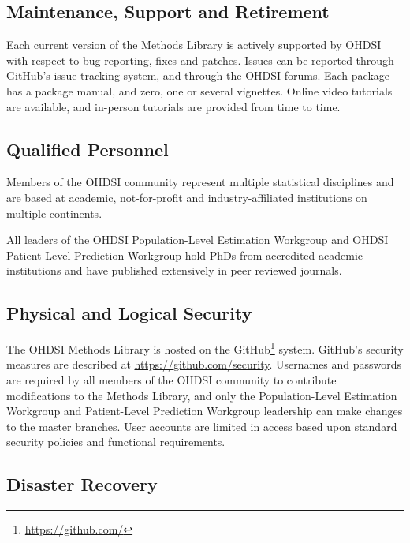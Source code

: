 \documentclass[11pt]{book}
\let\rmarkdownfootnote\footnote%
\def\footnote{\protect\rmarkdownfootnote}
\theoremstyle{definition}
\theoremstyle{definition}
\theoremstyle{definition}
\theoremstyle{remark}
\begin{document}
\hypertarget{maintenance-support-and-retirement}{%
\subsection{Maintenance, Support and Retirement}\label{maintenance-support-and-retirement}}

Each current version of the Methods Library is actively supported by OHDSI with respect to bug reporting, fixes and patches. Issues can be reported through GitHub's issue tracking system, and through the OHDSI forums. Each package has a package manual, and zero, one or several vignettes. Online video tutorials are available, and in-person tutorials are provided from time to time.

\hypertarget{qualified-personnel}{%
\subsection{Qualified Personnel}\label{qualified-personnel}}

Members of the OHDSI community represent multiple statistical disciplines and are based at academic, not-for-profit and industry-affiliated institutions on multiple continents.

All leaders of the OHDSI Population-Level Estimation Workgroup and OHDSI Patient-Level Prediction Workgroup hold PhDs from accredited academic institutions and have published extensively in peer reviewed journals.

\hypertarget{physical-and-logical-security}{%
\subsection{Physical and Logical Security}\label{physical-and-logical-security}}

The OHDSI Methods Library is hosted on the GitHub\footnote{\url{https://github.com/}} system. GitHub's security measures are described at \url{https://github.com/security}. Usernames and passwords are required by all members of the OHDSI community to contribute modifications to the Methods Library, and only the Population-Level Estimation Workgroup and Patient-Level Prediction Workgroup leadership can make changes to the master branches. User accounts are limited in access based upon standard security policies and functional requirements.

\hypertarget{disaster-recovery}{%
\subsection{Disaster Recovery}\label{disaster-recovery}}
\end{document}
